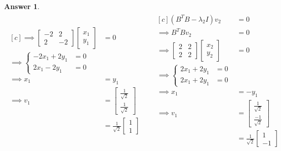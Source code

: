 \documentclass[10pt,a4paper]{article}
\theoremstyle{definition}
\newtheorem*{answer*}{Answer}
\theoremstyle{definition}
\numberwithin{equation}{section}
\begin{document}
\begin{answer*}
\begin{align*}
\begin{aligned}[c]
\implies \begin{bmatrix}
-2 & 2\\
2 & -2
\end{bmatrix} \begin{bmatrix}
x_1\\y_1
\end{bmatrix} &= 0\\
\implies \begin{cases}
-2x_1 + 2y_1 &= 0\\
2x_1 - 2y_1 &= 0
\end{cases}\\
\implies x_1 &= y_1\\
\implies v_1 &= \begin{bmatrix}
\frac{1}{\sqrt{2}}\\\frac{1}{\sqrt{2}}
\end{bmatrix}\\
&= \frac{1}{\sqrt{2}} \begin{bmatrix}
1\\1
\end{bmatrix}
\end{aligned}
&& \begin{aligned}[c]
(B^T B - \lambda_2 I)v_2 &= 0\\
\implies B^TB v_2 &= 0\\
\implies \begin{bmatrix}
2 & 2\\2 & 2
\end{bmatrix} \begin{bmatrix}
x_2\\y_2
\end{bmatrix} &= 0\\
\implies \begin{cases}
2x_1 + 2y_1 &= 0\\
2x_1 + 2y_1 &= 0
\end{cases}\\
\implies x_1 &= -y_1\\
\implies v_1 &= \begin{bmatrix}
\frac{1}{\sqrt{2}}\\\frac{-1}{\sqrt{2}}
\end{bmatrix}\\
&= \frac{1}{\sqrt{2}} \begin{bmatrix}
1\\-1
\end{bmatrix}
\end{aligned}\\
\end{align*}

\end{answer*}
\end{document}
